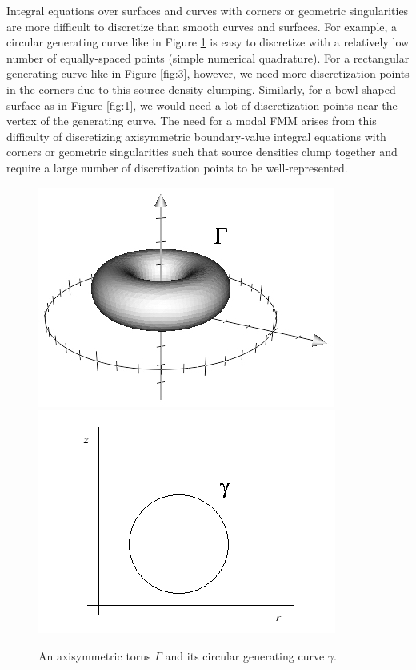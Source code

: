 \documentclass[11pt, oneside]{article}   	%
\begin{document}
Integral equations over surfaces and curves with corners or geometric singularities are more difficult to discretize than smooth curves and surfaces. For example, a circular generating curve like in Figure \ref{fig:2} is easy to discretize with a relatively low number of equally-spaced points (simple numerical quadrature). For a rectangular generating curve like in Figure \ref{fig:3}, however, we need more discretization points in the corners due to this source density clumping. Similarly, for a bowl-shaped surface as in Figure \ref{fig:1}, we would need a lot of discretization points near the vertex of the generating curve. The need for a modal FMM arises from this difficulty of discretizing axisymmetric boundary-value integral equations with corners or geometric singularities such that source densities clump together and require a large number of discretization points to be well-represented.
\begin{figure}[h]
\caption{An axisymmetric torus $\Gamma$ and its circular generating curve $\gamma$.}
\label{fig:2}
\centering
\includegraphics[scale=0.5]{./images/torus}
\includegraphics[scale=0.5]{./images/circle}
\end{figure}
\end{document}
